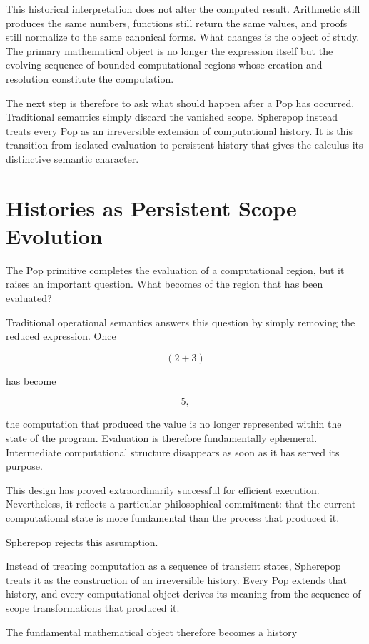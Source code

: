 \documentclass[12pt,oneside]{article}
\theoremstyle{definition}
\theoremstyle{remark}
\begin{document}
This historical interpretation does not alter the computed result. Arithmetic
still produces the same numbers, functions still return the same values, and
proofs still normalize to the same canonical forms. What changes is the object
of study. The primary mathematical object is no longer the expression itself
but the evolving sequence of bounded computational regions whose creation and
resolution constitute the computation.

The next step is therefore to ask what should happen after a Pop has occurred.
Traditional semantics simply discard the vanished scope. Spherepop instead
treats every Pop as an irreversible extension of computational history. It is
this transition from isolated evaluation to persistent history that gives the
calculus its distinctive semantic character.

\section{Histories as Persistent Scope Evolution}

The Pop primitive completes the evaluation of a computational region, but it
raises an important question. What becomes of the region that has been
evaluated?

Traditional operational semantics answers this question by simply removing the
reduced expression. Once

\[
(2+3)
\]

has become

\[
5,
\]

the computation that produced the value is no longer represented within the
state of the program. Evaluation is therefore fundamentally ephemeral.
Intermediate computational structure disappears as soon as it has served its
purpose.

This design has proved extraordinarily successful for efficient execution.
Nevertheless, it reflects a particular philosophical commitment: that the
current computational state is more fundamental than the process that produced
it.

Spherepop rejects this assumption.

Instead of treating computation as a sequence of transient states, Spherepop
treats it as the construction of an irreversible history. Every Pop extends
that history, and every computational object derives its meaning from the
sequence of scope transformations that produced it.

The fundamental mathematical object therefore becomes a history
\end{document}
